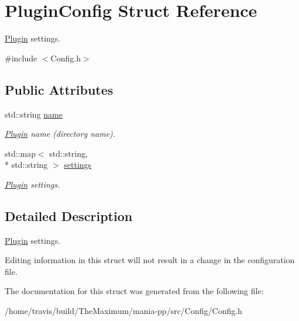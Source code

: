 \hypertarget{structPluginConfig}{\section{Plugin\-Config Struct Reference}
\label{structPluginConfig}
}


\hyperlink{classPlugin}{Plugin} settings.  




{\ttfamily \#include $<$Config.\-h$>$}

\subsection*{Public Attributes}
\begin{DoxyCompactItemize}
\item 
\hypertarget{structPluginConfig_a20cf80f9fcf8ef504fb0b770f9840f17}{std\-::string \hyperlink{structPluginConfig_a20cf80f9fcf8ef504fb0b770f9840f17}{name}}\label{structPluginConfig_a20cf80f9fcf8ef504fb0b770f9840f17}

\begin{DoxyCompactList}\small\item\em \hyperlink{classPlugin}{Plugin} name (directory name). \end{DoxyCompactList}\item 
\hypertarget{structPluginConfig_a16711457d0b98557f4a55f7514ae2706}{std\-::map$<$ std\-::string, \\*
std\-::string $>$ \hyperlink{structPluginConfig_a16711457d0b98557f4a55f7514ae2706}{settings}}\label{structPluginConfig_a16711457d0b98557f4a55f7514ae2706}

\begin{DoxyCompactList}\small\item\em \hyperlink{classPlugin}{Plugin} settings. \end{DoxyCompactList}\end{DoxyCompactItemize}


\subsection{Detailed Description}
\hyperlink{classPlugin}{Plugin} settings. 

Editing information in this struct will not result in a change in the configuration file. 

The documentation for this struct was generated from the following file\-:\begin{DoxyCompactItemize}
\item 
/home/travis/build/\-The\-Maximum/mania-\/pp/src/\-Config/Config.\-h\end{DoxyCompactItemize}
